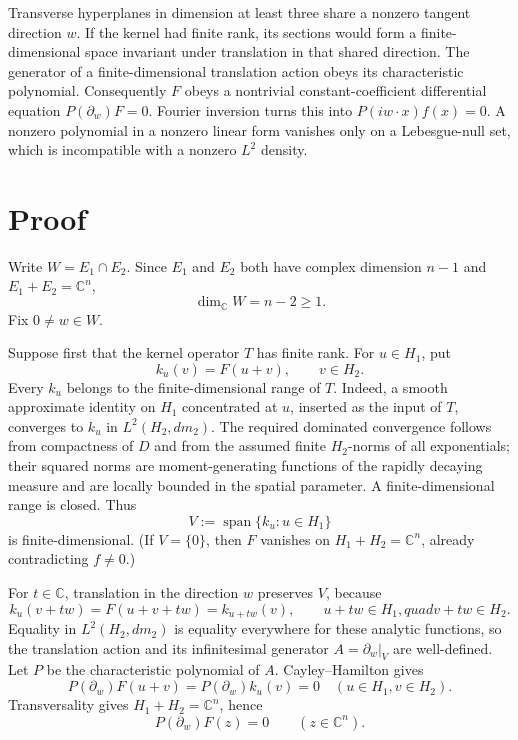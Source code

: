 \documentclass[11pt]{article}
\newcommand{\C}{\mathbb C}
\begin{document}
Transverse hyperplanes in dimension at least three share a nonzero tangent
direction $w$.  If the kernel had finite rank, its sections would form a
finite-dimensional space invariant under translation in that shared
direction.  The generator of a finite-dimensional translation action obeys
its characteristic polynomial.  Consequently $F$ obeys a nontrivial
constant-coefficient differential equation $P(\partial_w)F=0$.  Fourier
inversion turns this into $P(iw\cdot x)f(x)=0$.  A nonzero polynomial in a
nonzero linear form vanishes only on a Lebesgue-null set, which is
incompatible with a nonzero $L^2$ density.

\section*{Proof}

Write $W=E_1\cap E_2$.  Since $E_1$ and $E_2$ both have complex dimension
$n-1$ and $E_1+E_2=\C^n$,
\[
             \dim_{\C}W=n-2\ge1.
\]
Fix $0\ne w\in W$.

Suppose first that the kernel operator $T$ has finite rank.  For
$u\in H_1$, put
\[
                    k_u(v)=F(u+v),\qquad v\in H_2.
\]
Every $k_u$ belongs to the finite-dimensional range of $T$.  Indeed, a
smooth approximate identity on $H_1$ concentrated at $u$, inserted as the
input of $T$, converges to $k_u$ in $L^2(H_2,dm_2)$.  The required dominated
convergence follows from compactness of $D$ and from the assumed finite
$H_2$-norms of all exponentials; their squared norms are moment-generating
functions of the rapidly decaying measure and are locally bounded in the
spatial parameter.  A finite-dimensional range is closed.  Thus
\[
             V:=\operatorname{span}\{k_u:u\in H_1\}
\]
is finite-dimensional.  (If $V=\{0\}$, then $F$ vanishes on
$H_1+H_2=\C^n$, already contradicting $f\ne0$.)

For $t\in\C$, translation in the direction $w$ preserves $V$, because
\[
 k_u(v+tw)=F(u+v+tw)=k_{u+tw}(v),
 \qquad u+tw\in H_1,quad v+tw\in H_2.
\]
Equality in $L^2(H_2,dm_2)$ is equality everywhere for these analytic
functions, so the translation action and its infinitesimal generator
$A=\partial_w|_V$ are well-defined.  Let $P$ be the characteristic
polynomial of $A$.  Cayley--Hamilton gives
\[
             P(\partial_w)F(u+v)=P(\partial_w)k_u(v)=0
             \quad(u\in H_1, v\in H_2).
\]
Transversality gives $H_1+H_2=\C^n$, hence
\[
                        P(\partial_w)F(z)=0
                        \qquad(z\in\C^n).                 \tag{1}
\]
\end{document}
